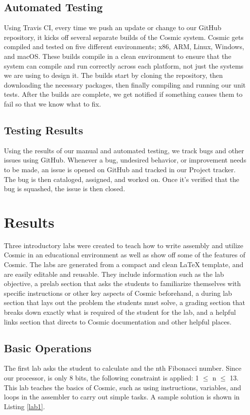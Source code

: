 \documentclass[conference]{IEEEtran}
\begin{document}
\subsection{Automated Testing}
Using Travis CI\cite{b5}, every time we push an update or change to our GitHub repository, it kicks off several separate builds of the Cosmic system. Cosmic gets compiled and tested on five different environments; x86, ARM, Linux, Windows, and macOS. These builds compile in a clean environment to ensure that the system can compile and run correctly across each platform, not just the systems we are using to design it. The builds start by cloning the repository, then downloading the necessary packages, then finally compiling and running our unit tests. After the builds are complete, we get notified if something causes them to fail so that we know what to fix.

\subsection{Testing Results}
Using the results of our manual and automated testing, we track bugs and other issues using GitHub. Whenever a bug, undesired behavior, or improvement needs to be made, an issue is opened on GitHub and tracked in our Project tracker. The bug is then cataloged, assigned, and worked on. Once it's verified that the bug is squashed, the issue is then closed.


\section{Results}
Three introductory labs were created to teach how to write assembly and utilize Cosmic in an educational environment as well as show off some of the features of Cosmic. The labs are generated from a compact and clean LaTeX template, and are easily editable and reusable. They include information such as the lab objective, a prelab section that asks the students to familiarize themselves with specific instructions or other key aspects of Cosmic beforehand, a during lab section that lays out the problem the students must solve, a grading section that breaks down exactly what is required of the student for the lab, and a helpful links section that directs to Cosmic documentation and other helpful places.

\subsection{Basic Operations}
The first lab asks the student to calculate and the nth Fibonacci number. Since our processor, is only 8 bits, the following constraint is applied: 1 $\leq$ n $\leq$ 13. This lab teaches the basics of Cosmic, such as using instructions, variables, and loops in the assembler to carry out simple tasks. A sample solution is shown in Listing \ref{lab1}.
\end{document}

